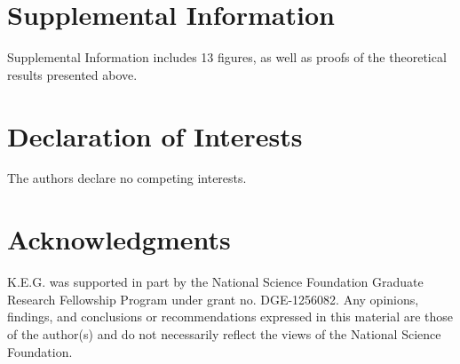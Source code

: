 \documentclass[12pt]{article}
\begin{document}



\newpage

\section{Supplemental Information}


Supplemental Information includes 13 figures, as well as proofs of the theoretical results presented above.


\section{Declaration of Interests}


The authors declare no competing interests.


\section{Acknowledgments}


K.E.G. was supported in part by the National Science Foundation Graduate Research Fellowship Program under grant no. DGE-1256082. Any opinions, findings, and conclusions or recommendations expressed in this material are those of the author(s) and do not necessarily reflect the views of the National Science Foundation.
\end{document}
